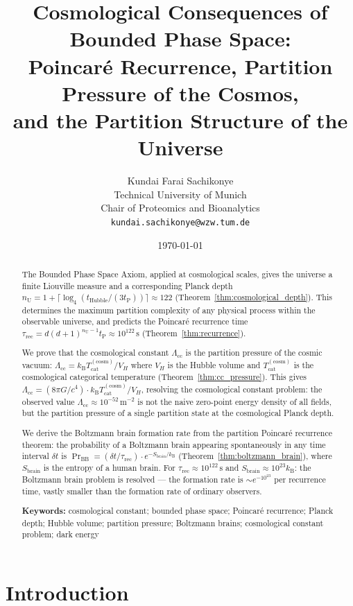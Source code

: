 \documentclass[twocolumn,10pt,a4paper]{article}
\title{\textbf{Cosmological Consequences of Bounded Phase Space:\\
Poincar\'e Recurrence, Partition Pressure of the Cosmos,\\
and the Partition Structure of the Universe}}
\author{
Kundai Farai Sachikonye\\
Technical University of Munich\\
Chair of Proteomics and Bioanalytics\\
\texttt{kundai.sachikonye@wzw.tum.de}
}
\date{\today}
\theoremstyle{thmstyle}
\theoremstyle{definition}
\theoremstyle{remark}
\newcommand{\kB}{k_{\mathrm{B}}}
\newcommand{\nU}{n_{\mathrm{U}}}
\newcommand{\tP}{t_{\mathrm{P}}}
\newcommand{\Tcat}{T_{\mathrm{cat}}}
\newcommand{\LambdaCC}{\Lambda_{\mathrm{cc}}}
\begin{document}
\maketitle

\begin{abstract}
\noindent
The Bounded Phase Space Axiom, applied at cosmological scales, gives the
universe a finite Liouville measure and a corresponding Planck depth
$\nU = 1 + \lceil\log_4(t_{\mathrm{Hubble}}/(3\tP))\rceil \approx 122$
(Theorem~\ref{thm:cosmological_depth}). This determines the maximum
partition complexity of any physical process within the observable universe,
and predicts the Poincar\'e recurrence time
$\tau_{\mathrm{rec}} = d(d+1)^{\nU-1}\tP \approx 10^{122}\,\mathrm{s}$
(Theorem~\ref{thm:recurrence}).

We prove that the cosmological constant $\LambdaCC$ is the partition
pressure of the cosmic vacuum: $\LambdaCC = \kB\Tcat^{(\mathrm{cosm})}/V_H$
where $V_H$ is the Hubble volume and $\Tcat^{(\mathrm{cosm})}$ is the
cosmological categorical temperature (Theorem~\ref{thm:cc_pressure}).
This gives $\LambdaCC = (8\pi G/c^4)\cdot\kB\Tcat^{(\mathrm{cosm})}/V_H$,
resolving the cosmological constant problem: the observed value
$\LambdaCC \approx 10^{-52}\,\mathrm{m}^{-2}$ is not the naive zero-point
energy density of all fields, but the partition pressure of a single
partition state at the cosmological Planck depth.

We derive the Boltzmann brain formation rate from the partition Poincar\'e
recurrence theorem: the probability of a Boltzmann brain appearing
spontaneously in any time interval $\delta t$ is
$\Pr_{\mathrm{BB}} = (\delta t/\tau_{\mathrm{rec}}) \cdot e^{-S_{\mathrm{brain}}/\kB}$
(Theorem~\ref{thm:boltzmann_brain}), where $S_{\mathrm{brain}}$ is the
entropy of a human brain. For $\tau_{\mathrm{rec}} \approx 10^{122}\,\mathrm{s}$
and $S_{\mathrm{brain}} \approx 10^{23}\kB$: the Boltzmann brain problem
is resolved --- the formation rate is $\sim e^{-10^{23}}$ per recurrence
time, vastly smaller than the formation rate of ordinary observers.

\medskip
\noindent\textbf{Keywords:} cosmological constant; bounded phase space;
Poincar\'e recurrence; Planck depth; Hubble volume; partition pressure;
Boltzmann brains; cosmological constant problem; dark energy
\end{abstract}

\tableofcontents

\section{Introduction}
\label{sec:intro}
\end{document}
